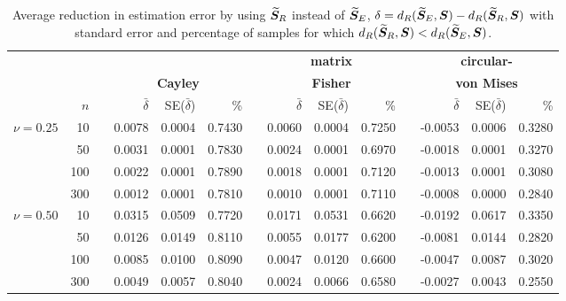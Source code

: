 \begin{table}[h]
\caption{Average reduction in estimation error by using ${\widetilde{\bm S}_R}$ instead of ${\widetilde{\bm S}_E}$, $\delta={d_R}({\widetilde{\bm S}_E},\bm S) - {d_R}({\widetilde{\bm S}_R},\bm S)$ with standard error and percentage of samples for which ${d_R}({\widetilde{\bm S}_R},\bm S) < {d_R}({\widetilde{\bm S}_E},\bm S)$.}
\label{tab:percL1}
\begin{center}
\begin{tabular}{rrcrrrcrrrcrrr}
  \hline
  &&&\multicolumn{3}{c}{} & &\multicolumn{3}{c}{\textbf{matrix} } &&\multicolumn{3}{c}{\textbf{circular-}}\\
    &&&\multicolumn{3}{c}{\textbf{Cayley}} & &\multicolumn{3}{c}{\textbf{Fisher}} & &\multicolumn{3}{c}{\textbf{von Mises}}\\ 
\rule[2mm]{0mm}{3mm} 
  &  $n$ && $\bar{\delta}$&SE($\bar\delta$) & \% & & $\bar{\delta}$&SE($\bar\delta$) & \% & & $\bar{\delta}$&SE($\bar\delta$) & \% \\ 
  \hline \hline
  \multirow{4}{*}{$\nu=0.25$} 
 &    10 && 0.0078 & 0.0004 & 0.7430 && 0.0060 & 0.0004 & 0.7250 && -0.0053 & 0.0006 & 0.3280 \\ 
 &    50 && 0.0031 & 0.0001 & 0.7830 && 0.0024 & 0.0001 & 0.6970 && -0.0018 & 0.0001 & 0.3270 \\ 
 &   100 && 0.0022 & 0.0001 & 0.7890 && 0.0018 & 0.0001 & 0.7120 && -0.0013 & 0.0001 & 0.3080 \\ 
 &   300 && 0.0012 & 0.0001 & 0.7810 && 0.0010 & 0.0001 & 0.7110 && -0.0008 & 0.0000 & 0.2840 \\
\hline
  \multirow{4}{*}{$\nu=0.50$} 
  &    10 && 0.0315 & 0.0509 & 0.7720 && 0.0171 & 0.0531 & 0.6620 && -0.0192 & 0.0617 & 0.3350 \\ 
  &    50 && 0.0126 & 0.0149 & 0.8110 && 0.0055 & 0.0177 & 0.6200 && -0.0081 & 0.0144 & 0.2820 \\ 
  &   100 && 0.0085 & 0.0100 & 0.8090 && 0.0047 & 0.0120 & 0.6600 && -0.0047 & 0.0087 & 0.3020 \\ 
  &   300 && 0.0049 & 0.0057 & 0.8040 && 0.0024 & 0.0066 & 0.6580 && -0.0027 & 0.0043 & 0.2550 \\


\end{tabular}
\end{center}
\end{table}
